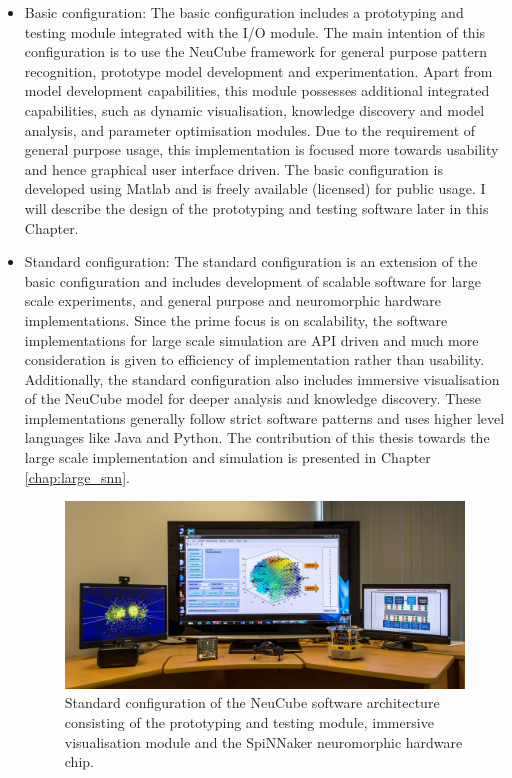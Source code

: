 \begin{itemize}
	\item Basic configuration: The basic configuration includes a prototyping and testing module integrated with the I/O module. The main intention of this configuration is to use the NeuCube framework for general purpose pattern recognition, prototype model development and experimentation. Apart from model development capabilities, this module possesses additional integrated capabilities, such as dynamic visualisation, knowledge discovery and model analysis, and parameter optimisation modules. Due to the requirement of general purpose usage, this implementation is focused more towards usability and hence graphical user interface driven. The basic configuration is developed using Matlab and is freely available (licensed) for public usage. I will describe the design of the prototyping and testing software later in this Chapter.
	
	\item Standard configuration: The standard configuration is an extension of the basic configuration and includes development of scalable software for large scale experiments, and general purpose and neuromorphic hardware implementations. Since the prime focus is on scalability, the software implementations for large scale simulation are API driven and much more consideration is given to efficiency of implementation rather than usability. Additionally, the standard configuration also includes immersive visualisation of the NeuCube model for deeper analysis and knowledge discovery. These implementations generally follow strict software patterns and uses higher level languages like Java and Python. The contribution of this thesis towards the large scale implementation and simulation is presented in Chapter \ref{chap:large_snn}. 
	
	\begin{figure}
		\centering
		\includegraphics[width=\linewidth]{fig/neucube/neucube_standard.jpg}
		\caption{Standard configuration of the NeuCube software architecture consisting of the prototyping and testing module, immersive visualisation module and the SpiNNaker neuromorphic hardware chip.}
		

\end{figure}
\end{itemize}

